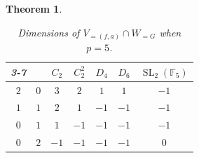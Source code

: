\documentclass{amsart}
\newcommand{\SL}{\operatorname{SL}}
\numberwithin{equation}{section}
\newtheorem{theorem}{Theorem}[section]  %
\theoremstyle{definition}
\theoremstyle{remark}
\begin{document}
\begin{theorem}
\begin{table}[H]
\centering
\begin{tabular}{cc|c|c|c|c|c|}
\cline{3-7}
                                                &                           & \cellcolor[HTML]{a7c957}$C_2$ & \cellcolor[HTML]{a7c957}$C_2^2$ & \cellcolor[HTML]{a7c957}$D_4$ & \cellcolor[HTML]{a7c957}$D_6$ & \cellcolor[HTML]{a7c957}$\SL_2(\mathbb{F}_5)$ \\ \hline
\multicolumn{1}{|c|}{\cellcolor[HTML]{a7c957}$2$} & \cellcolor[HTML]{a7c957}$0$ & $3$                             & $2$                                       & $1$                             & $1$                             & {\color[HTML]{C0C0C0} $-1$}                     \\ \hline
\multicolumn{1}{|c|}{\cellcolor[HTML]{a7c957}$1$} & \cellcolor[HTML]{a7c957}$1$ & $2$                             & $1$                                       & {\color[HTML]{C0C0C0} $-1$}     & {\color[HTML]{C0C0C0} $-1$}     & {\color[HTML]{C0C0C0} $-1$}                     \\ \hline
\multicolumn{1}{|c|}{\cellcolor[HTML]{a7c957}$0$} & \cellcolor[HTML]{a7c957}$1$ & $1$                             & {\color[HTML]{C0C0C0} $-1$}               & {\color[HTML]{C0C0C0} $-1$}     & {\color[HTML]{C0C0C0} $-1$}     & {\color[HTML]{C0C0C0} $-1$}                     \\ \hline
\multicolumn{1}{|c|}{\cellcolor[HTML]{a7c957}$0$} & \cellcolor[HTML]{a7c957}$2$ & {\color[HTML]{C0C0C0} $-1$}     & {\color[HTML]{C0C0C0} $-1$}               & {\color[HTML]{C0C0C0} $-1$}     & {\color[HTML]{C0C0C0} $-1$}     & $0$                                             \\ \hline
\end{tabular}
\caption{Dimensions of $V_{=(f,a)}\cap W_{= G}$ when $p=5$.}
\end{table}
\newpage


\end{theorem}
\end{document}
